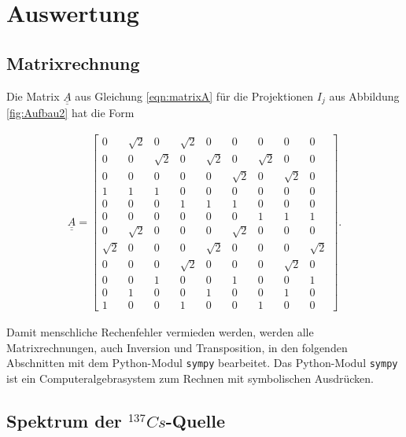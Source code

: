 \section{Auswertung}
\label{sec:Auswertung}

\subsection{Matrixrechnung}

Die Matrix $\underline{\underline{A}}$ aus Gleichung \ref{eqn:matrixA} für die Projektionen $I_j$ aus Abbildung \ref{fig:Aufbau2} hat die Form 

\begin{align}
  \underline{\underline{A}} = \left[\begin{matrix}0 & \sqrt{2} & 0 & \sqrt{2} & 0 & 0 & 0 & 0 & 0\\0 & 0 & \sqrt{2} & 0 & \sqrt{2} & 0 & \sqrt{2} & 0 & 0\\0 & 0 & 0 & 0 & 0 & \sqrt{2} & 0 & \sqrt{2} & 0\\1 & 1 & 1 & 0 & 0 & 0 & 0 & 0 & 0\\0 & 0 & 0 & 1 & 1 & 1 & 0 & 0 & 0\\0 & 0 & 0 & 0 & 0 & 0 & 1 & 1 & 1\\0 & \sqrt{2} & 0 & 0 & 0 & \sqrt{2} & 0 & 0 & 0\\\sqrt{2} & 0 & 0 & 0 & \sqrt{2} & 0 & 0 & 0 & \sqrt{2}\\0 & 0 & 0 & \sqrt{2} & 0 & 0 & 0 & \sqrt{2} & 0\\0 & 0 & 1 & 0 & 0 & 1 & 0 & 0 & 1\\0 & 1 & 0 & 0 & 1 & 0 & 0 & 1 & 0\\1 & 0 & 0 & 1 & 0 & 0 & 1 & 0 & 0\end{matrix}\right].
\end{align}

Damit menschliche Rechenfehler vermieden werden, werden alle Matrixrechnungen, auch Inversion und Transposition, in den folgenden Abschnitten mit dem Python-Modul \texttt{sympy} \cite{sympy} bearbeitet. Das Python-Modul \texttt{sympy} ist ein Computeralgebrasystem zum Rechnen mit symbolischen Ausdrücken. 

\subsection{Spektrum der $^{137}Cs$-Quelle}

